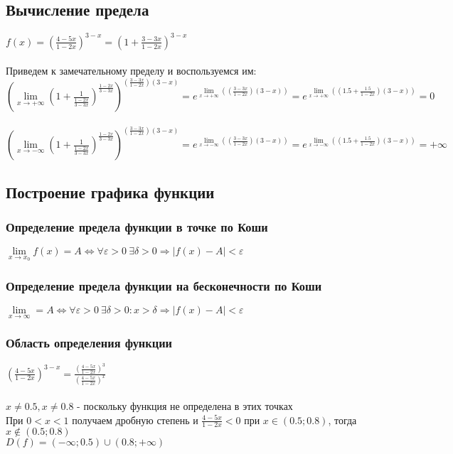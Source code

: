 \documentclass{article}
\begin{document}
\subsection{Вычисление предела}
$f(x) = (\frac{4 - 5x}{1 - 2x})^{3 - x} = (1 + \frac{3 - 3x}{1 - 2x})^{3-x}$ \\ \\
Приведем к замечательному пределу и воспользуемся им: \\
\large$(\lim\limits_{x \to +\infty} (1 + \frac{1}{\frac{1 - 2x}{3 - 3x}})^{\frac{1 - 2x}{3 - 3x}})^{(\frac{3 - 3x}{1 - 2x}) (3- x)} = e^{\lim\limits_{x \to +\infty} ((\frac{3 - 3x}{1 - 2x}) (3 - x))} = e^{\lim\limits_{x \to +\infty} ((1.5 + \frac{1.5}{1 - 2x}) (3 - x))} = 0$ \\ \\
\large$(\lim\limits_{x \to -\infty} (1 + \frac{1}{\frac{1 - 2x}{3 - 3x}})^{\frac{1 - 2x}{3 - 3x}})^{(\frac{3 - 3x}{1 - 2x}) (3- x)} = e^{\lim\limits_{x \to -\infty} ((\frac{3 - 3x}{1 - 2x}) (3 - x))} = e^{\lim\limits_{x \to -\infty} ((1.5 + \frac{1.5}{1 - 2x}) (3 - x))} = +\infty$

\subsection{Построение графика функции}

\subsubsection{Определение предела функции в точке по Коши}
$\lim\limits_{x \to x_0} f(x) = A \iff \forall \varepsilon > 0 \ \exists \delta > 0 \Rightarrow |f(x) - A| < \varepsilon$

\subsubsection{Определение предела функции на бесконечности по Коши}
$\lim\limits_{x \to \infty} = A \iff \forall \varepsilon > 0 \ \exists \delta > 0 : x > \delta \Rightarrow |f(x) - A| < \varepsilon$

\subsubsection{Область определения функции}
$(\frac{4 - 5x}{1 - 2x})^{3 - x} = \frac{(\frac{4 - 5x}{1 - 2x})^3}{(\frac{4 - 5x}{1 - 2x})^x}$ \\ \\
$x \neq 0.5, x \neq 0.8$ - поскольку функция не определена в этих точках \\
При $0 < x < 1$ получаем дробную степень и $\frac{4 - 5x}{1 - 2x} < 0$ при $x \in (0.5; 0.8)$, тогда $x \notin (0.5; 0.8)$\\
$D(f) = (- \infty; 0.5) \cup (0.8; + \infty)$
\end{document}
